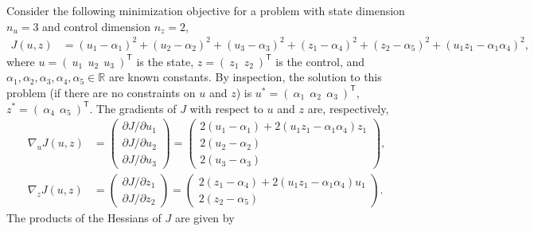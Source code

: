 \documentclass{article}
\newcommand{\trp}{^{\mathsf{T}}}
\begin{document}
Consider the following minimization objective for a problem with state dimension $n_{u} = 3$ and control dimension $n_{z} = 2$,
\begin{align*}
    J(u, z)
    &= (u_{1} - \alpha_{1})^{2} + (u_{2} - \alpha_{2})^{2} + (u_{3} - \alpha_{3})^{2}
    + (z_{1} - \alpha_{4})^{2} + (z_{2} - \alpha_{5})^{2} + (u_{1}z_{1} - \alpha_{1}\alpha_{4})^{2},
\end{align*}
where $u = (~u_{1}~~u_{2}~~u_{3}~)\trp$ is the state, $z = (~z_{1}~~z_{2}~)\trp$ is the control, and $\alpha_{1},\alpha_{2},\alpha_{3},\alpha_{4},\alpha_{5}\in\mathbb{R}$ are known constants.
By inspection, the solution to this problem (if there are no constraints on $u$ and $z$) is $u^{*} = (~\alpha_{1}~~\alpha_{2}~~\alpha_{3}~)\trp$, $z^{*} = (~\alpha_{4}~~\alpha_{5}~)\trp$.
The gradients of $J$ with respect to $u$ and $z$ are, respectively,
\begin{align*}
    \nabla_{u}J(u, z)
    &= \left(\begin{array}{c}
        \partial J / \partial u_{1} \\
        \partial J / \partial u_{2} \\
        \partial J / \partial u_{3}
    \end{array}\right)
    = \left(\begin{array}{c}
        2(u_{1} - \alpha_{1}) + 2(u_{1}z_{1} - \alpha_{1}\alpha_{4})z_{1}
        \\
        2(u_{2} - \alpha_{2})
        \\
        2(u_{3} - \alpha_{3})
    \end{array}\right),
    \\
    \nabla_{z}J(u, z)
    &= \left(\begin{array}{c}
        \partial J / \partial z_{1} \\
        \partial J / \partial z_{2}
    \end{array}\right)
    = \left(\begin{array}{c}
        2(z_{1} - \alpha_{4}) + 2(u_{1}z_{1} - \alpha_{1}\alpha_{4})u_{1}
        \\
        2(z_{2} - \alpha_{5})
    \end{array}\right).
\end{align*}
The products of the Hessians of $J$ are given by
\end{document}
